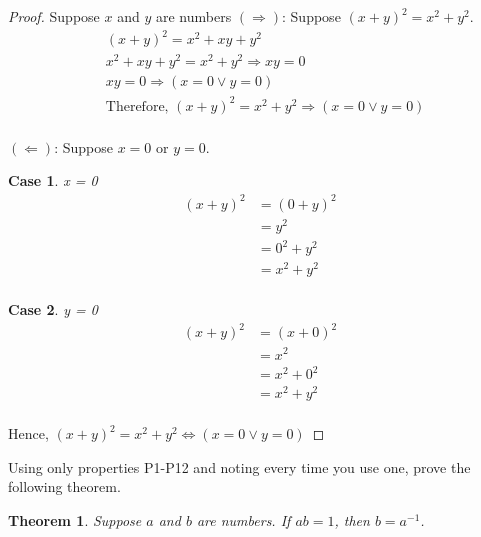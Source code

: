 \documentclass{article} %
\theoremstyle{plain}
\newtheorem*{theorem*}{Theorem}
\newtheorem{case}{Case}
\begin{document}
\begin{proof} Suppose $x$ and $y$ are numbers
    $(\Rightarrow)$: Suppose $(x+y)^2=x^2+y^2$.
    \begin{align*}
        & (x+y)^2 = x^2 + xy + y^2 \\
        & x^2 + xy + y^2 = x^2 + y^2 \Rightarrow xy = 0 \\
        & xy = 0 \Rightarrow (x = 0 \lor y = 0) \\
        & \text{Therefore, } (x+y)^2 = x^2 + y^2 \Rightarrow (x = 0 \lor y = 0) \\
    \end{align*} 

    $(\Leftarrow)$: Suppose $x=0$ or $y=0$.

    \setcounter{case}{0}
    \begin{case} x = 0
        \begin{align*}
            (x+y)^2 & = (0+y)^2 \\
            & = y^2 \\
            & = 0^2 + y^2 \\
            & = x^2 + y^2 \\
        \end{align*}
    \end{case}
    \begin{case} y = 0
        \begin{align*}
            (x+y)^2 & = (x+0)^2 \\
            & = x^2 \\
            & = x^2 + 0^2 \\
            & = x^2 + y^2 \\
        \end{align*}
    \end{case}

    Hence, $(x+y)^2 = x^2 + y^2 \Leftrightarrow (x = 0 \lor y = 0)$

\end{proof} 

\noindent{} Using only properties P1-P12 and noting every time you use one, prove the following theorem. 

\begin{theorem*}
Suppose $a$ and $b$ are numbers. If $ab=1$, then $b = a^{-1}$. 
\end{theorem*}
\end{document}
